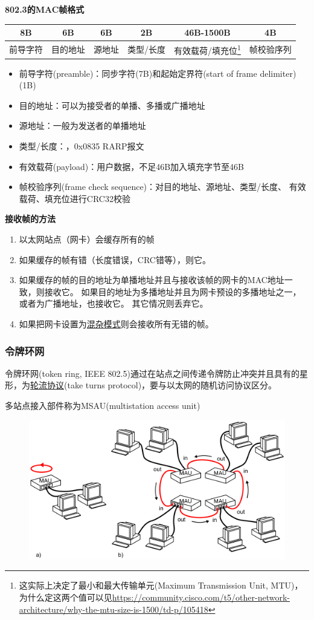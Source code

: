 \myhline
\textbf{802.3的MAC帧格式}
\begin{center}
\begin{tabular}{|c|c|c|c|c|c|}\hline
8B & 6B & 6B & 2B & 46B-1500B & 4B\\\hline
前导字符 & 目的地址 & 源地址 & 类型/长度 & 有效载荷/填充位\protect\footnote{这实际上决定了最小和最大传输单元(Maximum Transmission Unit, MTU)，为什么定这两个值可以见\url{https://community.cisco.com/t5/other-network-architecture/why-the-mtu-size-is-1500/td-p/105418}} & 帧校验序列\\\hline
\end{tabular}
\end{center}
\begin{itemize}
\item 前导字符(preamble)：同步字符(7B)和起始定界符(start of frame delimiter)(1B)
\item 目的地址：可以为接受者的单播、多播或广播地址
\item 源地址：一般为发送者的单播地址
\item 类型/长度：，0x0835 RARP报文
\item 有效载荷(payload)：用户数据，不足46B加入填充字节至46B
\item 帧校验序列(frame check sequence)：对目的地址、源地址、类型/长度、
有效载荷、填充位进行CRC32校验
\end{itemize}

\myhline
\textbf{接收帧的方法}
\begin{enumerate}
	\item 以太网站点（网卡）会缓存所有的帧
	\item 如果缓存的帧有错（长度错误，CRC错等），则它。
	\item 如果缓存的帧的目的地址为单播地址并且与接收该帧的网卡的MAC地址一致，则接收它。
	如果目的地址为多播地址并且为网卡预设的多播地址之一，或者为广播地址，也接收它。
	其它情况则丢弃它。
	\item 如果把网卡设置为\underline{混杂模式}则会接收所有无错的帧。
\end{enumerate}

\subsubsection{令牌环网}
令牌环网(token ring, IEEE 802.5)通过在站点之间传递令牌防止冲突并且具有的星形，为\underline{轮流协议}(take turns protocol)，要与以太网的随机访问协议区分。

多站点接入部件称为MSAU(multistation access unit)
\begin{figure}[H]
	\centering
	\includegraphics[width=0.5\linewidth]{fig/token-ring.png}
\end{figure}

